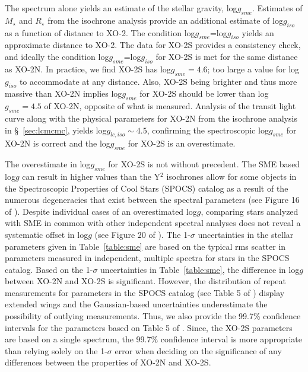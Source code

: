 \documentclass{emulateapj}
\newcommand{\xon}{XO-2}
\begin{document}
The spectrum alone yields an estimate of the stellar gravity,
log$g_{sme}$.  Estimates of $M_{\star}$ and $R_{\star}$ from the
isochrone analysis provide an additional estimate of log$g_{iso}$ as a
function of distance to \xon.  The condition log$g_{sme}$=log$g_{iso}$
yields an approximate distance to \xon .  The data for \xon S provides
a consistency check, and ideally the condition
log$g_{sme}$=log$g_{iso}$ for \xon S is met for the same distance as
\xon N.  In practice, we find \xon S has log$g_{sme}=4.6$; too large a
value for log$g_{iso}$ to accommodate at any distance.  Also, \xon S
being brighter and thus more massive than \xon N implies log$g_{sme}$ for
\xon S should be lower than log$g_{sme}=4.5$ of \xon N, opposite of what is
measured.  Analysis of the transit light curve along with the physical
parameters for \xon N from the isochrone analysis in
\S~\ref{sec:lcmcmc}, yields log$g_{lc,iso}\sim 4.5$, confirming the
spectroscopic log$g_{sme}$ for \xon N is correct and the log$g_{sme}$
for \xon S is an overestimate.

The overestimate in log$g_{sme}$ for \xon S is not without precedent.
The SME based log$g$ can result in higher values than the Y$^{2}$
isochrones allow for some objects in the Spectroscopic Properties of
Cool Stars (SPOCS) catalog as a result of the numerous degeneracies
that exist between the spectral parameters (see Figure 16 of
\citet{VAL05}).  Despite individual cases of an overestimated log$g$,
comparing stars analyzed with SME in common with other independent
spectral analyses does not reveal a systematic offset in log$g$ (see Figure 20
of \citet{VAL05}).  The 1-$\sigma$ uncertainties in the stellar
parameters given in Table~\ref{table:sme} are based on the typical rms
scatter in parameters measured in independent, multiple spectra for
stars in the SPOCS catalog.  Based on the 1-$\sigma$ uncertainties in
Table~\ref{table:sme}, the difference in log$g$ between \xon N and
\xon S is significant.  However, the distribution of repeat
measurements for parameters in the SPOCS catalog (see Table 5 of
\citet{VAL05}) display extended wings and the Gaussian-based
uncertainties underestimate the possibility of outlying measurements.
Thus, we also provide the 99.7\% confidence intervals for the
parameters based on Table 5 of \citet{VAL05}.  Since, the \xon S
parameters are based on a single spectrum, the 99.7\% confidence
interval is more appropriate than relying solely on the 1-$\sigma$
error when deciding on the significance of any differences between the
properties of \xon N and \xon S.  
\end{document}
